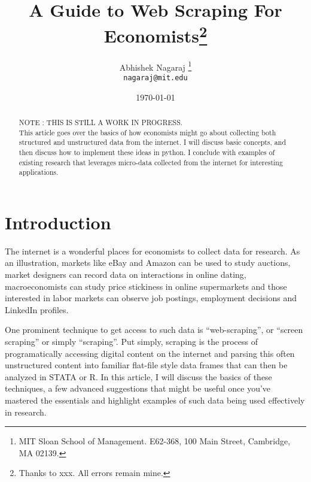 \documentclass[12pt]{article}
\begin{document}
\setlength{\parskip}{4.5pt}

\baselineskip 18.5pt

\title{A Guide to Web Scraping For Economists\footnote{Thanks to xxx. All errors remain mine.}}

\author{Abhishek Nagaraj \footnote{MIT Sloan School of Management. E62-368, 100 Main Street, Cambridge, MA 02139.}
\\         \texttt{nagaraj@mit.edu}   
}

\date{\today}

\maketitle
\thispagestyle{empty}

\begin{abstract}
NOTE : THIS IS STILL A WORK IN PROGRESS. \\ This article goes over the basics of how economists might go about collecting both structured and unstructured data from the internet. I will discuss basic concepts, and then discuss how to implement these ideas in python. I conclude with examples of existing research that leverages micro-data collected from the internet for interesting applications. 
\end{abstract}

\newpage

\section{Introduction}
The internet is a wonderful places for economists to collect data for research. As an illustration, markets like eBay and Amazon can be used to study auctions, market designers can record data on interactions in online dating, macroeconomists can study price stickiness in online supermarkets and those interested in labor markets can observe job postings, employment decisions and LinkedIn profiles. 

One prominent technique to get access to such data is ``web-scraping'', or ``screen scraping'' or simply ``scraping''. Put simply, scraping is the process of programatically accessing digital content on the internet and parsing this often unstructured content into familiar flat-file style data frames that can then be analyzed in STATA or R. In this article, I will discuss the basics of these techniques, a few advanced suggestions that might be useful once you've mastered the essentials and highlight examples of such data being used effectively in research.
\end{document}
